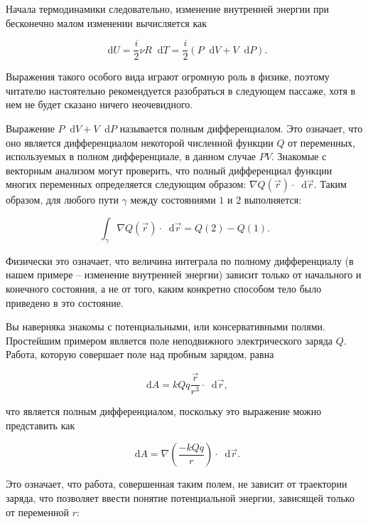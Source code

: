 \documentclass{article}
\renewcommand{\d}{\mathop{}\!\mathrm{d}}
\begin{document}
\begin{section}{Начала термодинамики}
		следовательно, изменение внутренней энергии при бесконечно малом изменении вычисляется как

		\begin{equation*}
			\d U = \frac{i}{2} \nu R \d T = \frac{i}{2} (P \d V + V \d P).
		\end{equation*}

		Выражения такого особого вида играют огромную роль в физике, поэтому читателю настоятельно рекомендуется разобраться в следующем пассаже, хотя в нем не будет сказано ничего неочевидного.

		Выражение $P \d V + V \d P$ называется полным дифференциалом. Это означает, что оно является дифференциалом некоторой численной функции $Q$ от переменных, используемых в полном дифференциале, в данном случае $PV$. Знакомые с векторным анализом могут проверить, что полный дифференциал функции многих переменных определяется следующим образом: $\nabla Q(\vec{r}) \cdot \d \vec{r}$. Таким образом, для любого пути $\gamma$ между состояниями $1$ и $2$ выполняется:

		\begin{equation*}
			\int_{\gamma} \nabla Q(\vec{r}) \cdot \d \vec{r} = Q(2) - Q(1).
		\end{equation*}

		Физически это означает, что величина интеграла по полному дифференциалу (в нашем примере -- изменение внутренней энергии) зависит только от начального и конечного состояния, а не от того, каким конкретно способом тело было приведено в это состояние.

		Вы наверняка знакомы с потенциальными, или консервативными полями. Простейшим примером является поле неподвижного электрического заряда $Q$. Работа, которую совершает поле над пробным зарядом, равна

		\begin{equation*}
			\d A = kQq \frac{\vec{r}}{r^3} \cdot \d \vec{r},
		\end{equation*}

		что является полным дифференциалом, поскольку это выражение можно представить как

		\begin{equation*}
			\d A = \nabla \left( \frac{-kQq}{r} \right) \cdot \d \vec{r}.
		\end{equation*}

		Это означает, что работа, совершенная таким полем, не зависит от траектории заряда, что позволяет ввести понятие потенциальной энергии, зависящей только от переменной $r$:


\end{section}
\end{document}
